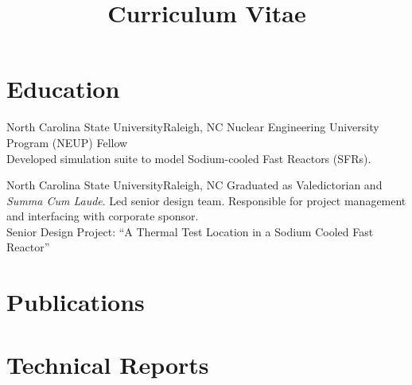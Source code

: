 \documentclass[letterpaper,12pt,nocolor,final]{moderncv}
\title{Curriculum Vitae}
\begin{document}
\maketitle

\nocite{*}


\section{Education}  

    {North Carolina State University}{Raleigh, NC}{}{
    Nuclear Engineering University Program (NEUP) Fellow \\
    Developed simulation suite to model Sodium-cooled Fast Reactors (SFRs).
    \vspace{-1\topsep}
    \printbibliography[keyword={mastersthesis},heading=none]}
  \vspace{\topsep}

    {North Carolina State University}{Raleigh, NC}{}{
    Graduated as Valedictorian and \textit{Summa Cum Laude}.
    Led senior design team. Responsible for project management and interfacing with corporate sponsor. \\
    Senior Design Project: ``A Thermal Test Location in a Sodium Cooled Fast Reactor''}


\section{Publications}
  \printbibliography[keyword={publications},heading=none]

\section{Technical Reports}
  \printbibliography[keyword={techreport},heading=none]


\end{document}
